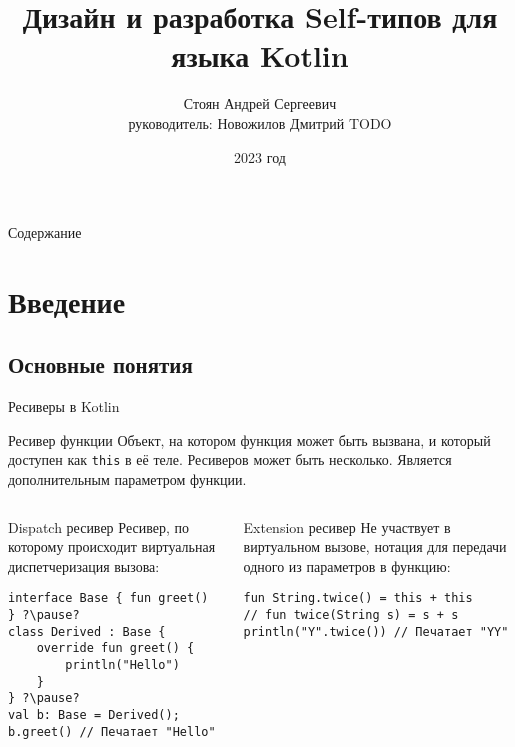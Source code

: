 \documentclass[handout,aspectratio=169,usenames,dvipsnames]{beamer}
\author[Андрей Стоян]{Стоян Андрей Сергеевич\\ {\small руководитель:} Новожилов Дмитрий TODO}
\institute[ИТМО/SE]{Национальный исследовательский университет ИТМО\\Разработка программного обеспечения/Software engineering}
\title[Дизайн Self-типов для языка Kotlin]{Дизайн и разработка Self-типов для языка Kotlin}
\date{2023 год}
\begin{document}
\maketitle

\begin{frame}{Содержание}
    \tableofcontents
\end{frame}

\section{Введение}

\subsection{Основные понятия}

\begin{frame}[fragile]{Ресиверы в Kotlin}
    \begin{block}{Ресивер функции}
        Объект, на котором функция может быть вызвана, и который доступен как \texttt{this} в её теле. Ресиверов может быть несколько. Является дополнительным параметром функции.
    \end{block}

    \pause
    \begin{columns}[onlytextwidth]
        \begin{column}{0.46\textwidth}
            \begin{block}{Dispatch ресивер}
                Ресивер, по которому происходит виртуальная диспетчеризация вызова:
                \begin{verbatim}
interface Base { fun greet() } ?\pause?
class Derived : Base {
    override fun greet() {
        println("Hello")
    }
} ?\pause?
val b: Base = Derived();
b.greet() // Печатает "Hello"
                \end{verbatim}
            \end{block}
        \end{column}\hfill%
        \pause
        \begin{column}{0.48\textwidth}
            \begin{block}{Extension ресивер}
                Не участвует в виртуальном вызове, нотация для передачи одного из параметров в функцию:
                 \begin{verbatim}
fun String.twice() = this + this
// fun twice(String s) = s + s
println("Y".twice()) // Печатает "YY"
                 \end{verbatim}
            \end{block}
        \end{column}
    \end{columns}
\end{frame}
\end{document}
